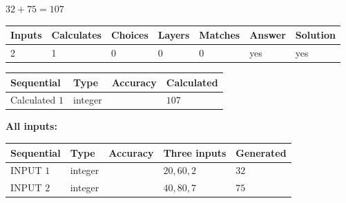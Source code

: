 \documentclass[12pt]{article}
\begin{document}
 
\noindent{}
 
 

$ %
32 +  %
75=   %
107$
 
 
\noindent{}
 
 

 
   
   
   
   
\noindent\begin{tabular}{|l|l|l|l|l|l|l|}
 \hline
Inputs & Calculates & Choices & Layers & Matches & Answer & Solution \\ \hline
 2  & 
 1  & 
 0
  & 
 0  & 
 0  & 
  yes & 
  yes 
  \\ \hline
 \end{tabular}
   
   
   
   
\noindent{}
   
   
  
  
\noindent\begin{tabular}{|l|l|l|l|}
\hline
 Sequential & Type & Accuracy & Calculated \\ 
\hline
 
 
  Calculated $  1 $ & integer &  & 
  $ 107 $ 
 \\  \hline  
 \end{tabular}
   
   
   
   
\noindent\vspace{0.1in}\hspace{-0.08in} {\textbf{\Large{All inputs: }}}
   
   
  
  
\noindent\begin{tabular}{|l|l|l|l|l|}
\hline
 Sequential & Type & Accuracy & Three inputs & Generated \\ 
\hline
 
 
  INPUT $  1 $ & integer &  & $
 20
 , 
 60
 , 
 2
 $ & $ 32 $ 
 \\  \hline  
 
 
  INPUT $  2 $ & integer &  & $
 40
 , 
 80
 , 
 7
 $ & $ 75 $ 
 \\  \hline  
 \end{tabular}
   
   
  
\end{document}
